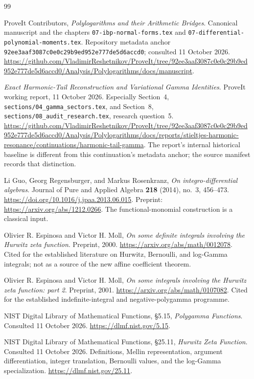 \documentclass[11pt,letterpaper]{article}
\numberwithin{equation}{section}
\theoremstyle{definition}\newtheorem{definition}[theorem]{Definition}
\theoremstyle{remark}\newtheorem{remark}[theorem]{Remark}
\newcommand{\src}[1]{\nolinkurl{#1}}
\newcommand{\pin}{92ee3aaf3087c0e0c29b9ed952e777de5d6accd0}
\begin{document}
\begin{thebibliography}{99}
\raggedright
{}
ProveIt Contributors, \emph{Polylogarithms and their Arithmetic Bridges}.
Canonical manuscript and the chapters
\src{07-ibp-normal-forms.tex} and
\src{07-differential-polynomial-moments.tex}.
Repository metadata anchor \texttt{\pin}; consulted 11 October 2026.
\url{https://github.com/VladimirReshetnikov/ProveIt/tree/92ee3aaf3087c0e0c29b9ed952e777de5d6accd0/Analysis/Polylogarithms/docs/manuscript}.

\emph{Exact Harmonic-Tail Reconstruction and Variational Gamma
Identities}. ProveIt working report, 11 October 2026.
Especially Section~4, \src{sections/04_gamma_sectors.tex}, and
Section~8, \src{sections/08_audit_research.tex}, research question~5.
\url{https://github.com/VladimirReshetnikov/ProveIt/tree/92ee3aaf3087c0e0c29b9ed952e777de5d6accd0/Analysis/Polylogarithms/docs/reports/stieltjes-harmonic-resonance/continuations/harmonic-tail-gamma}.
The report's internal historical baseline is different from this
continuation's metadata anchor; the source manifest records that distinction.

Li Guo, Georg Regensburger, and Markus Rosenkranz,
\emph{On integro-differential algebras}.
Journal of Pure and Applied Algebra \textbf{218} (2014), no.~3,
456--473. \url{https://doi.org/10.1016/j.jpaa.2013.06.015}.
Preprint: \url{https://arxiv.org/abs/1212.0266}.
The functional-monomial construction is a classical input.

Olivier R. Espinosa and Victor H. Moll,
\emph{On some definite integrals involving the Hurwitz zeta function}.
Preprint, 2000. \url{https://arxiv.org/abs/math/0012078}.
Cited for the established literature on Hurwitz, Bernoulli, and
log-Gamma integrals; not as a source of the new affine coefficient theorem.

Olivier R. Espinosa and Victor H. Moll,
\emph{On some integrals involving the Hurwitz zeta function: part 2}.
Preprint, 2001. \url{https://arxiv.org/abs/math/0107082}.
Cited for the established indefinite-integral and negative-polygamma
programme.

NIST Digital Library of Mathematical Functions, \S5.15,
\emph{Polygamma Functions}. Consulted 11 October 2026.
\url{https://dlmf.nist.gov/5.15}.

NIST Digital Library of Mathematical Functions, \S25.11,
\emph{Hurwitz Zeta Function}. Consulted 11 October 2026.
Definitions, Mellin representation, argument differentiation,
integer translation, Bernoulli values, and the log-Gamma specialization.
\url{https://dlmf.nist.gov/25.11}.


\end{thebibliography}
\end{document}
